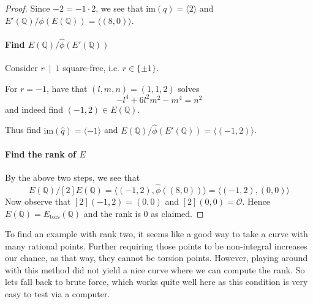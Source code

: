 \documentclass{scrartcl}
\newcommand{\Q}{\mathbb{Q}}
\newcommand{\im}{\mathrm{im}}
\renewcommand{\O}{\mathcal{O}}
\newcommand{\divides}{\ \mid \ }
\theoremstyle{definition}
\begin{document}
\begin{proof}
    Since $-2 = -1 \cdot 2$, we see that $\im(q) = \langle 2 \rangle$ and $E'(\Q)/\phi(E(\Q)) = \langle (8, 0) \rangle$.

    \paragraph{Find $E(\Q)/\hat{\phi}(E'(\Q))$} Consider $r \divides 1$ square-free, i.e. $r \in \{ \pm 1 \}$.

    For $r = -1$, have that $(l, m, n) = (1, 1, 2)$ solves
    \begin{equation*}
        -l^4 + 6l^2m^2 - m^4 = n^2
    \end{equation*}
    and indeed find $(-1, 2) \in E(\Q)$.

    Thus find $\im(\hat{q}) = \langle -1 \rangle$ and $E(\Q)/\hat{\phi}(E'(\Q)) = \langle (-1, 2) \rangle$.

    \paragraph{Find the rank of $E$} By the above two steps, we see that
    \begin{equation*}
        E(\Q)/[2]E(\Q) = \langle (-1, 2), \hat{\phi}((8, 0)) \rangle = \langle (-1, 2), (0, 0) \rangle
    \end{equation*}
    Now observe that $[2](-1, 2) = (0, 0)$ and $[2](0, 0) = \O$.
    Hence $E(\Q) = E_{\mathrm{tors}}(\Q)$ and the rank is 0 as claimed.
\end{proof}
To find an example with rank two, it seems like a good way to take a curve with many rational points.
Further requiring those points to be non-integral increases our chance, as that way, they cannot be torsion points.
However, playing around with this method did not yield a nice curve where we can compute the rank.
So lets fall back to brute force, which works quite well here as this condition is very easy to test via a computer.
\end{document}
